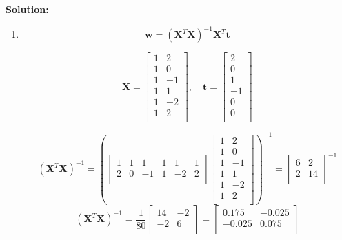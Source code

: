 \documentclass[a4paper,12pt]{article}
\begin{document}
\textbf{Solution:}
\begin{enumerate}[label=\alph*)]
    \item
    \[
    \mathbf{w} = (\mathbf{X}^T \mathbf{X})^{-1} \mathbf{X}^T \mathbf{t}
    \]
    
    \[
    \mathbf{X} = \begin{bmatrix}
    1 & 2 \\
    1 & 0 \\
    1 & -1 \\
    1 & 1 \\
    1 & -2 \\
    1 & 2 \\
    \end{bmatrix}, \quad \mathbf{t} = \begin{bmatrix}
    2 \\
    0 \\
    1 \\
    -1 \\
    0 \\
    0 \\
    \end{bmatrix}
    \]

    \[
    (\mathbf{X}^T \mathbf{X})^{-1} = \left(\begin{bmatrix}
        1 & 1 & 1 & 1 & 1 & 1 \\
        2 & 0 & -1 & 1 & -2 & 2 \\
    \end{bmatrix} \begin{bmatrix}
        1 & 2 \\
        1 & 0 \\
        1 & -1 \\
        1 & 1 \\
        1 & -2 \\
        1 & 2 \\
    \end{bmatrix}\right)^{-1} = \begin{bmatrix}
        6 & 2 \\
        2 & 14 \\
    \end{bmatrix}^{-1}
    \]
    \[(\mathbf{X}^T \mathbf{X})^{-1} = \frac{1}{80} \begin{bmatrix}
        14 & -2 \\
        -2 & 6 \\
        \end{bmatrix} = \begin{bmatrix}
            0.175 & -0.025 \\
            -0.025 & 0.075 \\
        \end{bmatrix}   
    \]


\end{enumerate}
\end{document}
